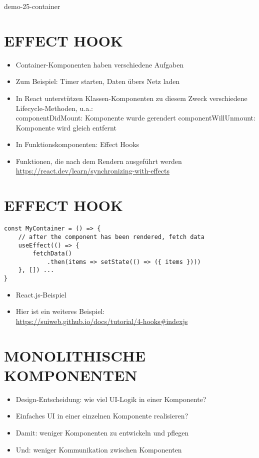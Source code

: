 demo-25-container

\section*{EFFECT HOOK}
\begin{itemize}
  \item Container-Komponenten haben verschiedene Aufgaben
  \item Zum Beispiel: Timer starten, Daten übers Netz laden
  \item In React unterstützen Klassen-Komponenten zu diesem Zweck verschiedene Lifecycle-Methoden, u.a.:\\
componentDidMount: Komponente wurde gerendert componentWillUnmount: Komponente wird gleich entfernt
  \item In Funktionskomponenten: Effect Hooks
  \item Funktionen, die nach dem Rendern ausgeführt werden\\
\href{https://react.dev/learn/synchronizing-with-effects}{https://react.dev/learn/synchronizing-with-effects}
\end{itemize}

\section*{EFFECT HOOK}
\begin{verbatim}
const MyContainer = () => {
    // after the component has been rendered, fetch data
    useEffect(() => {
        fetchData()
            .then(items => setState(() => ({ items })))
    }, []) ...
}
\end{verbatim}

\begin{itemize}
  \item React.js-Beispiel
  \item Hier ist ein weiteres Beispiel:\\
\href{https://suiweb.github.io/docs/tutorial/4-hooks#indexjs}{https://suiweb.github.io/docs/tutorial/4-hooks\#indexjs}
\end{itemize}

\section*{MONOLITHISCHE KOMPONENTEN}
\begin{itemize}
  \item Design-Entscheidung: wie viel UI-Logik in einer Komponente?
  \item Einfaches UI in einer einzelnen Komponente realisieren?
  \item Damit: weniger Komponenten zu entwickeln und pflegen
  \item Und: weniger Kommunikation zwischen Komponenten
\end{itemize}


